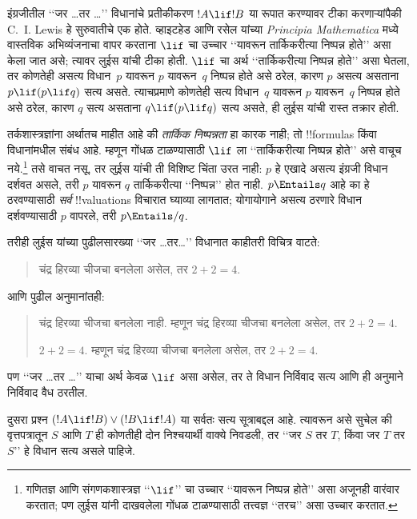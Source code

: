 \documentclass[../../../include/open-logic-section]{subfiles}
\begin{document}


इंग्रजीतील ‘‘जर \dots तर \dots’’
विधानांचे प्रतीकीकरण $!A \lif !B$
या रूपात करण्यावर टीका करणाऱ्यांपैकी
C.~I. Lewis हे सुरुवातीचे एक होते.
व्हाइटहेड आणि रसेल यांच्या
\emph{Principia Mathematica} मध्ये
वास्तविक अभिव्यंजनाचा वापर करताना
$\lif$ चा उच्चार ‘‘यावरून
तार्किकरीत्या निष्पन्न होते’’ असा
केला जात असे; त्यावर लुईस यांची
टीका होती. $\lif$ चा अर्थ
‘‘तार्किकरीत्या निष्पन्न होते’’
असा घेतला, तर कोणतेही असत्य
विधान~$p$ यावरून $p$ यावरून~$q$
निष्पन्न होते असे ठरेल, कारण
$p$ असत्य असताना
$p \lif (p \lif q)$ सत्य असते.
त्याचप्रमाणे कोणतेही सत्य
विधान~$q$ यावरून $p$ यावरून~$q$
निष्पन्न होते असे ठरेल, कारण
$q$ सत्य असताना
$q \lif (p \lif q)$ सत्य असते,
ही लुईस यांची रास्त तक्रार होती.

तर्कशास्त्रज्ञांना अर्थातच माहीत
आहे की \emph{तार्किक निष्पन्नता}
हा कारक नाही; तो !!{formula}s
किंवा विधानांमधील संबंध आहे.
म्हणून गोंधळ टाळण्यासाठी
$\lif$ ला ‘‘तार्किकरीत्या निष्पन्न
होते’’ असे वाचूच नये.\footnote{
  गणितज्ञ आणि संगणकशास्त्रज्ञ
  ‘‘$\lif$’’ चा उच्चार ‘‘यावरून
  निष्पन्न होते’’ असा अजूनही
  वारंवार करतात; पण लुईस यांनी
  दाखवलेला गोंधळ टाळण्यासाठी
  तत्त्वज्ञ ‘‘तरच’’ असा
  उच्चार करतात.} तसे
वाचत नसू, तर लुईस यांची
ती विशिष्ट चिंता उरत नाही:
$p$ हे एखादे असत्य इंग्रजी
विधान दर्शवत असले, तरी
$p$ यावरून $q$ तार्किकरीत्या
‘‘निष्पन्न’’ होत नाही.
$p \Entails q$ आहे का हे
ठरवण्यासाठी \emph{सर्व}
!!{valuation}s विचारात घ्याव्या
लागतात; योगायोगाने असत्य
ठरणारे विधान दर्शवण्यासाठी
$p$ वापरले, तरी
$p \Entails/ q$.

तरीही लुईस यांच्या पुढीलसारख्या
‘‘जर \dots तर\dots’’ विधानात
काहीतरी विचित्र वाटते:
\begin{quote}
चंद्र हिरव्या चीजचा बनलेला असेल,
तर $2+2=4$.
\end{quote}
आणि पुढील अनुमानांतही:
\begin{quote}
  चंद्र हिरव्या चीजचा बनलेला नाही.
  म्हणून चंद्र हिरव्या चीजचा
  बनलेला असेल, तर $2+2=4$.

  $2+2 = 4$. म्हणून चंद्र
  हिरव्या चीजचा बनलेला
  असेल, तर $2+2=4$.
\end{quote}
पण ‘‘जर \dots तर \dots’’
याचा अर्थ केवळ $\lif$
असा असेल, तर ते विधान
निर्विवाद सत्य आणि ही
अनुमाने निर्विवाद वैध ठरतील.

दुसरा प्रश्न $(!A \lif !B) \lor (!B \lif
!A)$ या सर्वतः सत्य सूत्राबद्दल
आहे. त्यावरून असे सुचेल की
वृत्तपत्रातून $S$ आणि $T$
ही कोणतीही दोन निश्चयार्थी
वाक्ये निवडली, तर ‘‘जर
$S$ तर $T$, किंवा जर
$T$ तर~$S$’’ हे विधान
सत्य असले पाहिजे.
\end{document}
